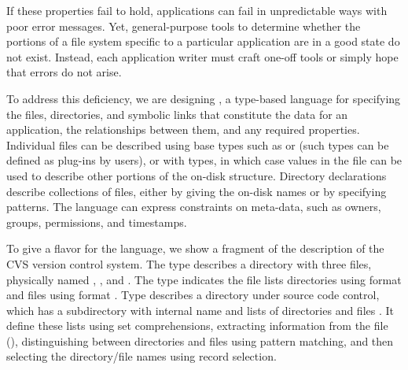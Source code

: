 \documentclass[nocopyrightspace,10pt]{sigplanconf}
\begin{document}
If these properties fail to hold, applications can fail in
unpredictable ways with poor error messages.  Yet, general-purpose
tools to determine whether the portions of a file system specific to a
particular application are in a good state do not exist.  Instead, each
application writer must craft one-off tools or simply hope that errors
do not arise. 

To address this deficiency, we are designing \dirpads{}, a type-based language
for specifying the files, directories, and symbolic links that
constitute the data for an application, the relationships between
them, and any required properties.  Individual files can be described
using base types such as  or  (such types can be
defined as plug-ins by users), or with \pads{}\cite{fisher+:pads}
types, in which case values in the file can be used to describe other
portions of the on-disk structure.  Directory declarations describe
collections of files, either by giving the on-disk names or by
specifying patterns.   The language
can express constraints on meta-data, such as
owners, groups, permissions, and timestamps.  

To give a flavor for the language, we show a fragment of the
description of the CVS version control system.  The type
 describes a directory with three files, physically named
, , and . 
The \pads{} type  indicates the  file 
lists directories using format 
and files using format .  Type  describes a
directory under source code control, which has a subdirectory with
internal name  and lists of directories  and files
.  It define these lists using set comprehensions,
extracting information from the 
file (), distinguishing between 
directories and files using pattern matching, and then selecting the
directory/file names using record selection.
\end{document}
